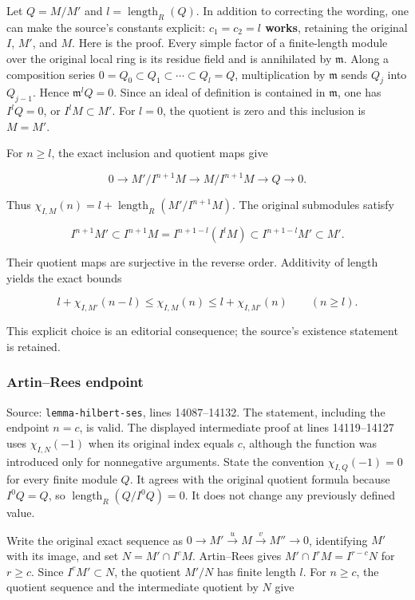 Let \(Q=M/M'\) and \(l=\operatorname{length}_R(Q)\). In addition to correcting the wording, one can make the source's constants explicit: \textbf{\(c_1=c_2=l\) works}, retaining the original \(I\), \(M'\), and \(M\). Here is the proof. Every simple factor of a finite-length module over the original local ring is its residue field and is annihilated by \(\mathfrak m\). Along a composition series \(0=Q_0\subset Q_1\subset\cdots\subset Q_l=Q\), multiplication by \(\mathfrak m\) sends \(Q_j\) into \(Q_{j-1}\). Hence \(\mathfrak m^lQ=0\). Since an ideal of definition is contained in \(\mathfrak m\), one has \(I^lQ=0\), or \(I^lM\subset M'\). For \(l=0\), the quotient is zero and this inclusion is \(M=M'\).

For \(n\geq l\), the exact inclusion and quotient maps give

\[
0\longrightarrow M'/I^{n+1}M\longrightarrow M/I^{n+1}M
\longrightarrow Q\longrightarrow0.
\]

Thus \(\chi_{I,M}(n)=l+\operatorname{length}_R(M'/I^{n+1}M)\). The original submodules satisfy

\[
I^{n+1}M'\subset I^{n+1}M
 =I^{n+1-l}(I^lM)\subset I^{n+1-l}M'\subset M'.
\]

Their quotient maps are surjective in the reverse order. Additivity of length yields the exact bounds

\[
l+\chi_{I,M'}(n-l)\leq\chi_{I,M}(n)
\leq l+\chi_{I,M'}(n)\qquad(n\geq l).
\]

This explicit choice is an editorial consequence; the source's existence statement is retained.

\subsubsection{Artin--Rees endpoint}\label{algebra-proof-003-artinrees-endpoint}

Source: \texttt{lemma-hilbert-ses}, lines 14087--14132. The statement, including the endpoint \(n=c\), is valid. The displayed intermediate proof at lines 14119--14127 uses \(\chi_{I,N}(-1)\) when its original index equals \(c\), although the function was introduced only for nonnegative arguments. State the convention \(\chi_{I,Q}(-1)=0\) for every finite module \(Q\). It agrees with the original quotient formula because \(I^0Q=Q\), so \(\operatorname{length}_R(Q/I^0Q)=0\). It does not change any previously defined value.

Write the original exact sequence as \(0\to M'\xrightarrow{u}M\xrightarrow{v}M''\to0\), identifying \(M'\) with its image, and set \(N=M'\cap I^cM\). Artin--Rees gives \(M'\cap I^rM=I^{r-c}N\) for \(r\geq c\). Since \(I^cM'\subset N\), the quotient \(M'/N\) has finite length \(l\). For \(n\geq c\), the quotient sequence and the intermediate quotient by \(N\) give

